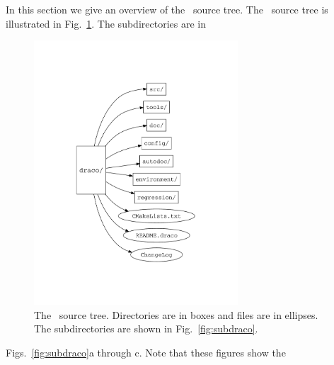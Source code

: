 In this section we give an overview of the \draco\ source tree. The
\draco\ source tree is illustrated in Fig.~\ref{fig:src_draco}.  The
subdirectories are in 
\begin{figure}
  \centerline{\includegraphics[width=3in]{fig/src_draco}} %
  \caption{The \draco\ source tree.  Directories are in boxes and
    files are in ellipses.  The subdirectories are shown in
    Fig.~\ref{fig:subdraco}.}
  \label{fig:src_draco}
\end{figure}
Figs.~\ref{fig:subdraco}a through c.  Note that these figures show the
